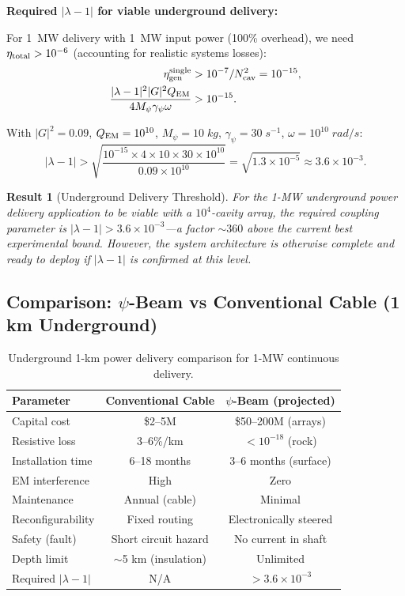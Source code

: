 \documentclass[aps,prd,twocolumn,superscriptaddress]{revtex4-2}
\newcommand{\Mpsi}{M_\psi}
\newtheorem{result}{Result}
\begin{document}
\textbf{Required $|\lambda-1|$ for viable underground delivery:}

For 1~MW delivery with 1~MW input power (100\% overhead), we need
$\eta_{\rm total} > 10^{-6}$ (accounting for realistic systems losses):
\begin{align}
\eta_{\rm gen}^{\rm single} &> 10^{-7}/N_{\rm cav}^2 = 10^{-15}, \\
\frac{|\lambda-1|^2|G|^2 Q_{\rm EM}}{4\Mpsi\gamma_\psi\omega} &> 10^{-15}.
\end{align}

With $|G|^2 = 0.09$, $Q_{\rm EM} = 10^{10}$, $\Mpsi = 10\;\si{kg}$,
$\gamma_\psi = 30\;\si{s^{-1}}$, $\omega = 10^{10}\;\si{rad/s}$:
\begin{equation}
|\lambda-1| > \sqrt{\frac{10^{-15}\times 4\times10\times30\times10^{10}}
{0.09\times10^{10}}} = \sqrt{1.3\times10^{-5}} \approx 3.6\times10^{-3}.
\end{equation}

\begin{result}[Underground Delivery Threshold]
For the 1-MW underground power delivery application to be viable with
a $10^4$-cavity array, the required coupling parameter is
$|\lambda-1| > 3.6\times10^{-3}$---a factor $\sim 360$ above the
current best experimental bound.  However, the system architecture
is otherwise complete and ready to deploy if $|\lambda-1|$ is
confirmed at this level.
\end{result}

\subsection{Comparison: $\psi$-Beam vs Conventional Cable (1 km Underground)}

\begin{table}[h]
\caption{Underground 1-km power delivery comparison for 1-MW
continuous delivery.}
\label{tab:underground}
\begin{ruledtabular}
\begin{tabular}{lcc}
Parameter & Conventional Cable & $\psi$-Beam (projected) \\
\hline
Capital cost & \$2--5M & \$50--200M (arrays) \\
Resistive loss & 3--6\%/km & $< 10^{-18}$ (rock) \\
Installation time & 6--18 months & 3--6 months (surface) \\
EM interference & High & Zero \\
Maintenance & Annual (cable) & Minimal \\
Reconfigurability & Fixed routing & Electronically steered \\
Safety (fault) & Short circuit hazard & No current in shaft \\
Depth limit & $\sim$5 km (insulation) & Unlimited \\
Required $|\lambda-1|$ & N/A & $> 3.6\times10^{-3}$ \\
\end{tabular}
\end{ruledtabular}
\end{table}
\end{document}
